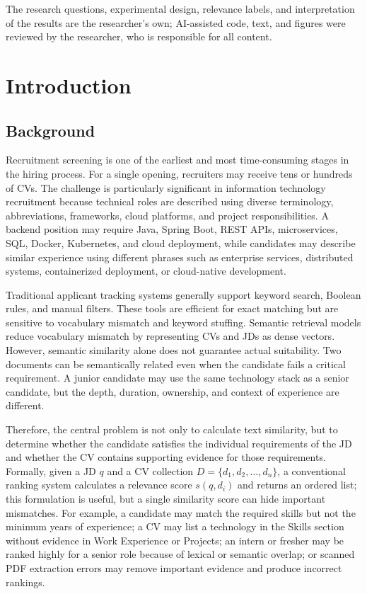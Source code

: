 \documentclass[12pt,a4paper,oneside]{report}
\begin{document}
The research questions, experimental design, relevance labels, and interpretation of the results are the researcher's own; AI-assisted code, text, and figures were reviewed by the researcher, who is responsible for all content.

\tableofcontents
\listoffigures
\listoftables
\clearpage

\chapter{Introduction}

\section{Background}
Recruitment screening is one of the earliest and most time-consuming stages in the hiring process. For a single opening, recruiters may receive tens or hundreds of CVs. The challenge is particularly significant in information technology recruitment because technical roles are described using diverse terminology, abbreviations, frameworks, cloud platforms, and project responsibilities. A backend position may require Java, Spring Boot, REST APIs, microservices, SQL, Docker, Kubernetes, and cloud deployment, while candidates may describe similar experience using different phrases such as enterprise services, distributed systems, containerized deployment, or cloud-native development.

Traditional applicant tracking systems generally support keyword search, Boolean rules, and manual filters. These tools are efficient for exact matching but are sensitive to vocabulary mismatch and keyword stuffing. Semantic retrieval models reduce vocabulary mismatch by representing CVs and JDs as dense vectors. However, semantic similarity alone does not guarantee actual suitability. Two documents can be semantically related even when the candidate fails a critical requirement. A junior candidate may use the same technology stack as a senior candidate, but the depth, duration, ownership, and context of experience are different.

Therefore, the central problem is not only to calculate text similarity, but to determine whether the candidate satisfies the individual requirements of the JD and whether the CV contains supporting evidence for those requirements. Formally, given a JD $q$ and a CV collection $D=\{d_1,d_2,\ldots,d_n\}$, a conventional ranking system calculates a relevance score $s(q,d_i)$ and returns an ordered list; this formulation is useful, but a single similarity score can hide important mismatches. For example, a candidate may match the required skills but not the minimum years of experience; a CV may list a technology in the Skills section without evidence in Work Experience or Projects; an intern or fresher may be ranked highly for a senior role because of lexical or semantic overlap; or scanned PDF extraction errors may remove important evidence and produce incorrect rankings.
\end{document}
